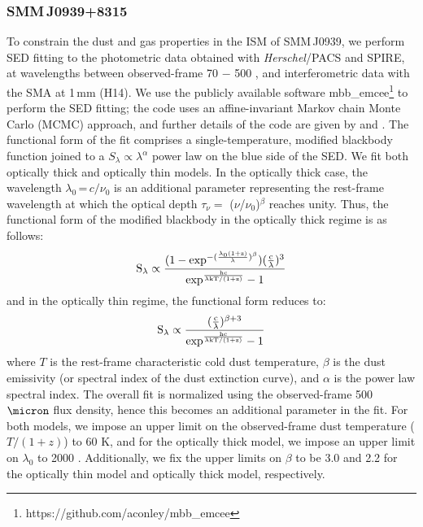 \documentclass[twocolumn,apj,numberedappendix]{emulateapj}
\begin{document}
\subsubsection{SMM\,J0939+8315} \label{sec:SEDBg}
To constrain the dust and gas properties in the ISM of SMM\,J0939, we perform SED fitting to the
photometric data obtained with {\it Herschel}/PACS and SPIRE, at wavelengths
between observed-frame 70 \micron $-$ 500 \micron, and interferometric data with the SMA at 1\,mm (H14). We use the publicly
available software {\sc mbb\_emcee}\footnote{https://github.com/aconley/mbb\_emcee} to perform the SED fitting; the code uses an affine-invariant Markov chain Monte
Carlo (MCMC) approach, and further details of the code are given by \citet{Riechers13a} and \citet{Dowell14a}. The
functional form of the fit comprises a single-temperature, modified blackbody function joined to a $S_{\lambda} \propto \lambda^\alpha
$ power law on the blue
side of the SED.
We fit both optically thick and optically thin models. In the optically thick case, the wavelength $
\lambda_0$\,=\,${c}/{\nu_0}$ is an additional parameter representing the rest-frame wavelength at which the optical
depth $\tau_{\nu} =$ ($\nu$/$\nu_0$)$^\beta$ reaches unity. Thus, the functional form of the modified blackbody
in the optically thick regime is as follows:
\begin{equation}
\rm S_{\lambda} \propto \frac{(1-exp^{-(\frac{\lambda_0 (1+z)}{\lambda})^{\beta}})(\frac{c}{\lambda})^3}
{exp^{\frac{hc}{\lambda\rm{kT/(1+z)} } }-1}
\end{equation}
and in the optically thin regime, the functional form reduces to:
\begin{equation}
\rm S_{\lambda} \propto \frac{(\frac{c}{\lambda})^{\beta+3}}{exp^{\frac{hc}{\lambda\rm{kT/(1+z)}}}-1}
\end{equation}
where $T$ is the rest-frame characteristic cold dust temperature, $\beta$ is the dust emissivity (or spectral index of the dust extinction
curve), and $\alpha$ is the power law spectral index. The overall fit is normalized using the observed-frame 500
$\micron$ flux density, hence this becomes an additional parameter in the fit. For both models, we impose an upper limit on the observed-frame dust temperature ($T/(1+z)$) to 60 K, and for the optically thick model, we impose an upper limit on $\lambda_0$ to 2000\,\,\micron. Additionally, we fix the upper limits on 
$\beta$ to be 3.0 and 2.2 for the optically thin model and optically thick model, respectively.
\end{document}
